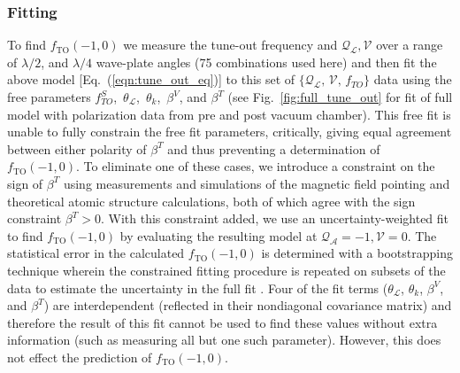 \documentclass[%
 amsmath,amssymb,
aps,
]{revtex4-2}
\begin{document}
 \subsubsection{Fitting}
 
To find \(f_{\mathrm{TO}}(-1,0)\) we measure the tune-out frequency and \(\mathcal{Q_{L}},\mathcal{V}\) over a range of $\lambda/2$, and $\lambda/4$ wave-plate angles (75 combinations used here) and then fit the above model [Eq.~(\ref{eqn:tune_out_eq})] to this set of \(\{\mathcal{Q_{L}},\, \mathcal{V},\, f_{TO}\}\) data using the free parameters $f^{S}_{TO}$,\, $\theta_{\mathcal{L}}$,\, $\theta_{k}$,\, $\beta^V$, and $\beta^T$ (see Fig.~\ref{fig:full_tune_out} for fit of full model with polarization data from pre and post vacuum chamber). This free fit is unable to fully constrain the free fit parameters, critically, giving equal agreement between either polarity of \( \beta^T \) and thus preventing a determination of \(f_{\mathrm{TO}}(-1,0)\). 
To eliminate one of these cases, we introduce a constraint on the sign of  \( \beta^T \) using  measurements and simulations of the magnetic field pointing and theoretical atomic structure calculations, both of which agree with the sign constraint \( \beta^T >0 \).
With this constraint added, we use an uncertainty-weighted fit to find \(f_{\mathrm{TO}}(-1,0)\) by evaluating the resulting model at \(\mathcal{Q_{A}}=-1,\mathcal{V}=0\). The statistical error in the calculated \(f_{\mathrm{TO}}(-1,0)\) is determined with a bootstrapping technique wherein the constrained fitting procedure is repeated on subsets of the data to estimate the uncertainty in the full fit \cite{bryce_bootstrap_error_code}. 
Four of the fit terms ($\theta_{\mathcal{L}}$, $\theta_{k}$, $\beta^V$, and $\beta^T$) are interdependent (reflected in their nondiagonal covariance matrix) and therefore the result of this fit cannot be used to find these values without extra information (such as measuring all but one such parameter). However, this does not effect the prediction of \(f_{\mathrm{TO}}(-1,0)\).

\end{document}
